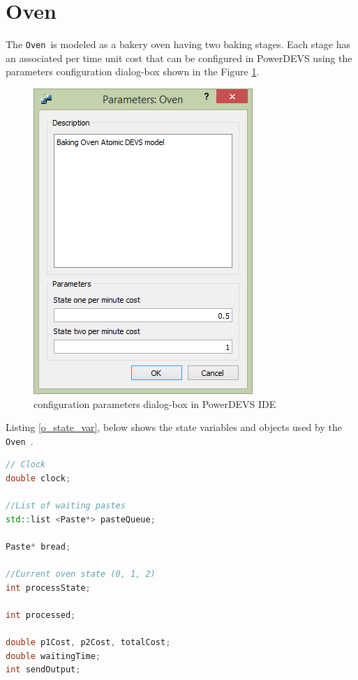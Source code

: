 \documentclass[titlepage]{report}%
\newcommand{\oven}{\texttt{Oven}~}
\begin{document}
{\section{Oven}
The \oven is modeled as a bakery oven having two baking stages. Each stage has an associated per time unit cost that can be configured in PowerDEVS using the parameters configuration dialog-box shown in the Figure \ref{fig:oven_params}.
\begin{figure}[htbp]
	\centering
		\includegraphics[scale=0.8]{oven_params.PNG}
	\caption{{} configuration parameters dialog-box in PowerDEVS IDE}
	\label{fig:oven_params}
\end{figure}

Listing \ref{o_state_var}, below shows the state variables and objects used by the \oven.

\begin{lstlisting}[caption={State variables and objects used by \oven}, language=c++, label={o_state_var}]
// Clock
double clock;

//List of waiting pastes
std::list <Paste*> pasteQueue;

Paste* bread;

//Current oven state (0, 1, 2)
int processState;

int processed;

double p1Cost, p2Cost, totalCost;
double waitingTime;
int sendOutput;

\end{lstlisting}

}
\end{document}
